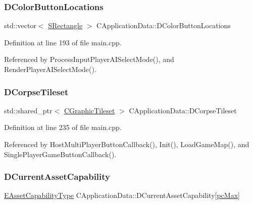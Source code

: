 \subsubsection{\texorpdfstring{D\+Color\+Button\+Locations}{DColorButtonLocations}}
{\footnotesize\ttfamily std\+::vector$<$ \hyperlink{structSRectangle}{S\+Rectangle} $>$ C\+Application\+Data\+::\+D\+Color\+Button\+Locations\hspace{0.3cm}{\ttfamily [protected]}}



Definition at line 193 of file main.\+cpp.



Referenced by Process\+Input\+Player\+A\+I\+Select\+Mode(), and Render\+Player\+A\+I\+Select\+Mode().

\hypertarget{classCApplicationData_aec983aa995cdb449344422d607fe0228}{}\label{classCApplicationData_aec983aa995cdb449344422d607fe0228} 
\subsubsection{\texorpdfstring{D\+Corpse\+Tileset}{DCorpseTileset}}
{\footnotesize\ttfamily std\+::shared\+\_\+ptr$<$ \hyperlink{classCGraphicTileset}{C\+Graphic\+Tileset} $>$ C\+Application\+Data\+::\+D\+Corpse\+Tileset\hspace{0.3cm}{\ttfamily [protected]}}



Definition at line 235 of file main.\+cpp.



Referenced by Host\+Multi\+Player\+Button\+Callback(), Init(), Load\+Game\+Map(), and Single\+Player\+Game\+Button\+Callback().

\hypertarget{classCApplicationData_a7e0dbfdc54f73dfa9838ae81b8017e2d}{}\label{classCApplicationData_a7e0dbfdc54f73dfa9838ae81b8017e2d} 
\subsubsection{\texorpdfstring{D\+Current\+Asset\+Capability}{DCurrentAssetCapability}}
{\footnotesize\ttfamily \hyperlink{GameDataTypes_8h_a35b98ce26aca678b03c6f9f76e4778ce}{E\+Asset\+Capability\+Type} C\+Application\+Data\+::\+D\+Current\+Asset\+Capability\mbox{[}\hyperlink{GameDataTypes_8h_aafb0ca75933357ff28a6d7efbdd7602fa594a5c8dd3987f24e8a0f23f1a72cd34}{pc\+Max}\mbox{]}\hspace{0.3cm}{\ttfamily [protected]}}



